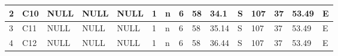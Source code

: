 {\begin{table}[]
\begin{tabular}{|l|l|l|l|l|l|l|l|l|l|l|l|l|l|l|}
		2                                 & C10                                       & NULL                                      & NULL                            & NULL                            & 1                               & n                                    & 6                                                                                    & 58                                                                                   & 34.1                                                                                 & S                                                                                 & 107                                                                                   & 37                                                                                    & 53.49                                                                                 & E                                                                                  \\ \hline
		3                                 & C11                                       & NULL                                      & NULL                            & NULL                            & 1                               & n                                    & 6                                                                                    & 58                                                                                   & 35.14                                                                                & S                                                                                 & 107                                                                                   & 37                                                                                    & 53.49                                                                                 & E                                                                                  \\ \hline
		4                                 & C12                                       & NULL                                      & NULL                            & NULL                            & 1                               & n                                    & 6                                                                                    & 58                                                                                   & 36.44                                                                                & S                                                                                 & 107                                                                                   & 37                                                                                    & 53.49                                                                                 & E                                                                                  \\ \hline

\end{tabular}
\end{table}}
